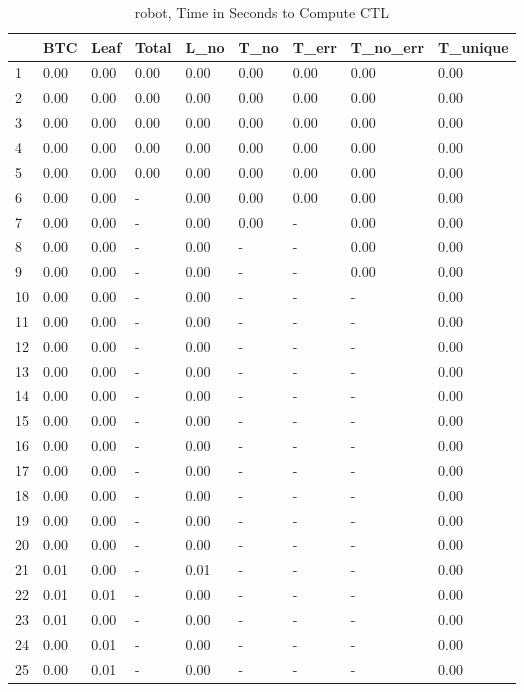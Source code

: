 \begin{table}
\centering
\caption{robot, Time in Seconds to Compute CTL}
\label{robot_CTL_time}
\begin{tabular}{lllllllll}
\toprule
{} &   BTC &  Leaf & Total &  L\_no &  T\_no & T\_err & T\_no\_err & T\_unique \\
\midrule
1  &  0.00 &  0.00 &  0.00 &  0.00 &  0.00 &  0.00 &     0.00 &     0.00 \\
2  &  0.00 &  0.00 &  0.00 &  0.00 &  0.00 &  0.00 &     0.00 &     0.00 \\
3  &  0.00 &  0.00 &  0.00 &  0.00 &  0.00 &  0.00 &     0.00 &     0.00 \\
4  &  0.00 &  0.00 &  0.00 &  0.00 &  0.00 &  0.00 &     0.00 &     0.00 \\
5  &  0.00 &  0.00 &  0.00 &  0.00 &  0.00 &  0.00 &     0.00 &     0.00 \\
6  &  0.00 &  0.00 &     - &  0.00 &  0.00 &  0.00 &     0.00 &     0.00 \\
7  &  0.00 &  0.00 &     - &  0.00 &  0.00 &     - &     0.00 &     0.00 \\
8  &  0.00 &  0.00 &     - &  0.00 &     - &     - &     0.00 &     0.00 \\
9  &  0.00 &  0.00 &     - &  0.00 &     - &     - &     0.00 &     0.00 \\
10 &  0.00 &  0.00 &     - &  0.00 &     - &     - &        - &     0.00 \\
11 &  0.00 &  0.00 &     - &  0.00 &     - &     - &        - &     0.00 \\
12 &  0.00 &  0.00 &     - &  0.00 &     - &     - &        - &     0.00 \\
13 &  0.00 &  0.00 &     - &  0.00 &     - &     - &        - &     0.00 \\
14 &  0.00 &  0.00 &     - &  0.00 &     - &     - &        - &     0.00 \\
15 &  0.00 &  0.00 &     - &  0.00 &     - &     - &        - &     0.00 \\
16 &  0.00 &  0.00 &     - &  0.00 &     - &     - &        - &     0.00 \\
17 &  0.00 &  0.00 &     - &  0.00 &     - &     - &        - &     0.00 \\
18 &  0.00 &  0.00 &     - &  0.00 &     - &     - &        - &     0.00 \\
19 &  0.00 &  0.00 &     - &  0.00 &     - &     - &        - &     0.00 \\
20 &  0.00 &  0.00 &     - &  0.00 &     - &     - &        - &     0.00 \\
21 &  0.01 &  0.00 &     - &  0.01 &     - &     - &        - &     0.00 \\
22 &  0.01 &  0.01 &     - &  0.00 &     - &     - &        - &     0.00 \\
23 &  0.01 &  0.00 &     - &  0.00 &     - &     - &        - &     0.00 \\
24 &  0.00 &  0.01 &     - &  0.00 &     - &     - &        - &     0.00 \\
25 &  0.00 &  0.01 &     - &  0.00 &     - &     - &        - &     0.00 \\
\bottomrule
\end{tabular}
\end{table}
